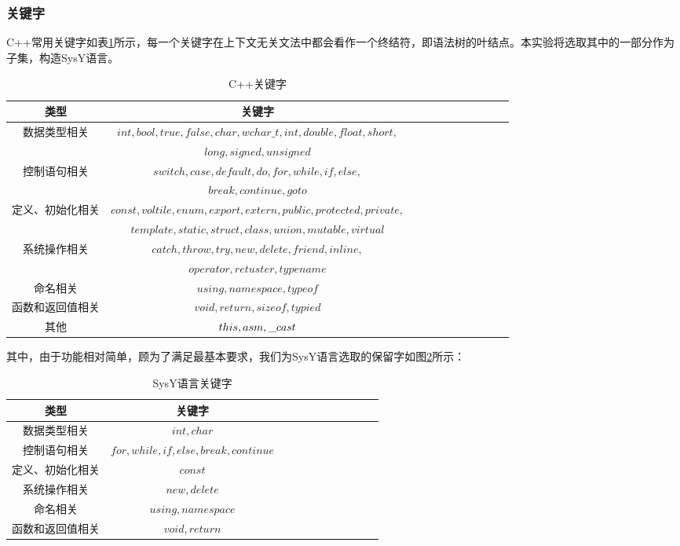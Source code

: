 \documentclass[UTF8,a4paper,10pt]{ctexart}
\begin{document}
\subsubsection{关键字}C++常用关键字如表\ref{fig:1}所示，每一个关键字在上下文无关文法中都会看作一个终结符，即语法树的叶结点。本实验将选取其中的一部分作为子集，构造SysY语言。
\begin{table}[!htbp]
  \centering
  \begin{tabular}{ccccccccccc}
  \toprule  
  类型& 关键字&\\
  \midrule
  数据类型相关&$int,bool,true,false,char,wchar\_t,int,double,float,short,$&\\
  & $long,signed,unsigned$&\\
  控制语句相关&$switch, case, default, do, for, while, if, else,$&\\
  & $break, continue, goto$&\\
  定义、初始化相关& $const, voltile, enum, export, extern, public, protected, private,$&\\ 
   & $template, static, struct, class, union, mutable, virtual$&\\
  系统操作相关& $catch, throw, try, new, delete, friend, inline, $&\\
  & $operator, retuster, typename$&\\
  命名相关& $using, namespace, typeof$&\\
  函数和返回值相关& $void, return, sizeof, typied$&\\
  其他& $this, asm, \*\_cast$&\\
  \bottomrule
  \end{tabular}
  \caption{C++关键字}
  \label{fig:1}
\end{table}
\par
其中，由于功能相对简单，顾为了满足最基本要求，我们为SysY语言选取的保留字如图\ref{fig:2}所示：
\begin{table}[!htbp]
  \centering
  \begin{tabular}{ccccccccccc}
  \toprule  
  类型& 关键字&\\
  \midrule
  数据类型相关&$int,char$&\\
  控制语句相关&$for, while, if, else, break, continue$&\\
  定义、初始化相关& $const$&\\ 
  系统操作相关& $new, delete$&\\
  命名相关& $using, namespace$&\\
  函数和返回值相关& $void, return$&\\
  \bottomrule
  \end{tabular}
  \caption{SysY语言关键字}
  \label{fig:2}
\end{table}
\end{document}
